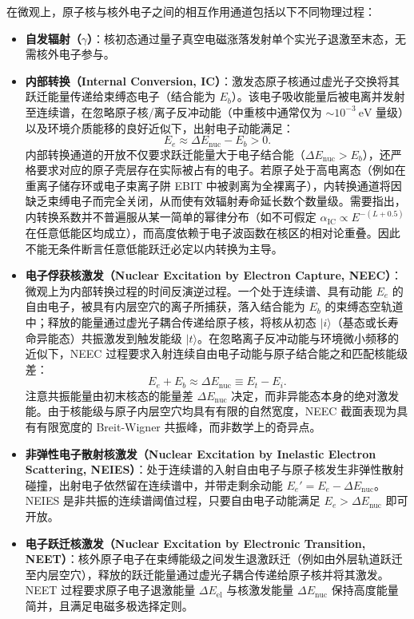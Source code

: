 在微观上，原子核与核外电子之间的相互作用通道包括以下不同物理过程：
\begin{itemize}
\item \textbf{自发辐射（$\gamma$）}：核初态通过量子真空电磁涨落发射单个实光子退激至末态，无需核外电子参与。
\item \textbf{内部转换（Internal Conversion, IC）}：激发态原子核通过虚光子交换将其跃迁能量传递给束缚态电子（结合能为 $E_b$）。该电子吸收能量后被电离并发射至连续谱，在忽略原子核/离子反冲动能（中重核中通常仅为 $\sim 10^{-3}\ \mathrm{eV}$ 量级）以及环境介质能移的良好近似下，出射电子动能满足：
\begin{equation}\label{eq:4-8-ic-energy-cons}
E_e \approx \Delta E_{\mathrm{nuc}} - E_b > 0.
\end{equation}
内部转换通道的开放不仅要求跃迁能量大于电子结合能（$\Delta E_{\mathrm{nuc}} > E_b$），还严格要求对应的原子壳层存在实际被占有的电子。若原子处于高电离态（例如在重离子储存环或电子束离子阱 EBIT 中被剥离为全裸离子），内转换通道将因缺乏束缚电子而完全关闭，从而使有效辐射寿命延长数个数量级。需要指出，内转换系数并不普遍服从某一简单的幂律分布（如不可假定 $\alpha_{\mathrm{IC}} \propto E^{-(L+0.5)}$ 在任意低能区均成立），而高度依赖于电子波函数在核区的相对论重叠。因此不能无条件断言任意低能跃迁必定以内转换为主导。
\item \textbf{电子俘获核激发（Nuclear Excitation by Electron Capture, NEEC）}：微观上为内部转换过程的时间反演逆过程。一个处于连续谱、具有动能 $E_e$ 的自由电子，被具有内层空穴的离子所捕获，落入结合能为 $E_b$ 的束缚态空轨道中；释放的能量通过虚光子耦合传递给原子核，将核从初态 $|i\rangle$（基态或长寿命异能态）共振激发到触发能级 $|t\rangle$。在忽略离子反冲动能与环境微小频移的近似下，NEEC 过程要求入射连续自由电子动能与原子结合能之和匹配核能级差：
\begin{equation}\label{eq:4-8-neec-resonance-cond}
E_e + E_b \approx \Delta E_{\mathrm{nuc}} \equiv E_t - E_i.
\end{equation}
注意共振能量由初末核态的能量差 $\Delta E_{\mathrm{nuc}}$ 决定，而非异能态本身的绝对激发能。由于核能级与原子内层空穴均具有有限的自然宽度，NEEC 截面表现为具有有限宽度的 Breit-Wigner 共振峰，而非数学上的奇异点。
\item \textbf{非弹性电子散射核激发（Nuclear Excitation by Inelastic Electron Scattering, NEIES）}：处于连续谱的入射自由电子与原子核发生非弹性散射碰撞，出射电子依然留在连续谱中，并带走剩余动能 $E_e' = E_e - \Delta E_{\mathrm{nuc}}$。NEIES 是非共振的连续谱阈值过程，只要自由电子动能满足 $E_e > \Delta E_{\mathrm{nuc}}$ 即可开放。
\item \textbf{电子跃迁核激发（Nuclear Excitation by Electronic Transition, NEET）}：核外原子电子在束缚能级之间发生退激跃迁（例如由外层轨道跃迁至内层空穴），释放的跃迁能量通过虚光子耦合传递给原子核并将其激发。NEET 过程要求原子电子退激能量 $\Delta E_{\mathrm{el}}$ 与核激发能量 $\Delta E_{\mathrm{nuc}}$ 保持高度能量简并，且满足电磁多极选择定则。
\end{itemize}

